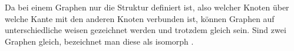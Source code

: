 Da bei einem Graphen nur die Struktur definiert ist, also welcher Knoten über welche Kante mit den anderen Knoten verbunden ist, können Graphen auf unterschiedliche weisen gezeichnet werden und trotzdem gleich sein.
Sind zwei Graphen gleich, bezeichnet man diese als isomorph \cite[Seite 22]{basicgraphtheory}.
%
%
